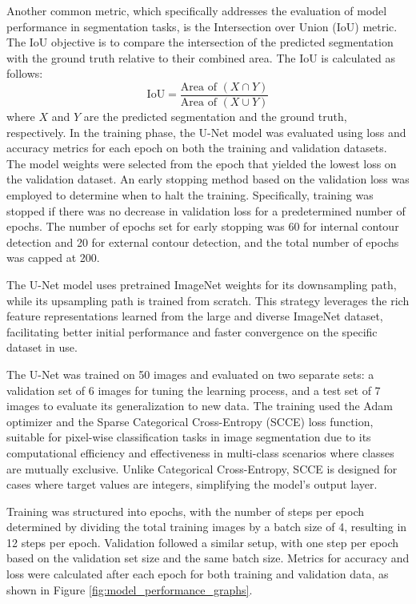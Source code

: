 \documentclass[preprint,12pt]{elsarticle}
\begin{document}
Another common metric, which specifically addresses the evaluation of model performance in segmentation tasks, is the Intersection over Union (IoU) metric. The IoU objective is to compare the intersection of the predicted segmentation with the ground truth relative to their combined area. The IoU is calculated as follows:
\begin{equation}
\text{IoU} = \frac{\text{Area of } (X \cap Y)}{\text{Area of } (X \cup Y)}
\end{equation}
where $X$ and $Y$ are the predicted segmentation and the ground truth, respectively.
In the training phase, the U-Net model was evaluated using loss and accuracy metrics for each epoch on both the training and validation datasets.
The model weights were selected from the epoch that yielded the lowest loss on the validation dataset.
An early stopping method based on the validation loss was employed to determine when to halt the training.
Specifically, training was stopped if there was no decrease in validation loss for a predetermined number of epochs.
The number of epochs set for early stopping was 60 for internal contour detection and 20 for external contour detection, and the total number of epochs was capped at 200.

The U-Net model uses pretrained ImageNet weights for its downsampling path, while its upsampling path is trained from scratch. This strategy leverages the rich feature representations learned from the large and diverse ImageNet dataset, facilitating better initial performance and faster convergence on the specific dataset in use.

The U-Net was trained on 50 images and evaluated on two separate sets: a validation set of 6 images for tuning the learning process, and a test set of 7 images to evaluate its generalization to new data. The training used the Adam optimizer and the Sparse Categorical Cross-Entropy (SCCE) loss function, suitable for pixel-wise classification tasks in image segmentation due to its computational efficiency and effectiveness in multi-class scenarios where classes are mutually exclusive. Unlike Categorical Cross-Entropy, SCCE is designed for cases where target values are integers, simplifying the model's output layer.

Training was structured into epochs, with the number of steps per epoch determined by dividing the total training images by a batch size of 4, resulting in 12 steps per epoch. Validation followed a similar setup, with one step per epoch based on the validation set size and the same batch size. Metrics for accuracy and loss were calculated after each epoch for both training and validation data, as shown in Figure \ref{fig:model_performance_graphs}.
\end{document}
